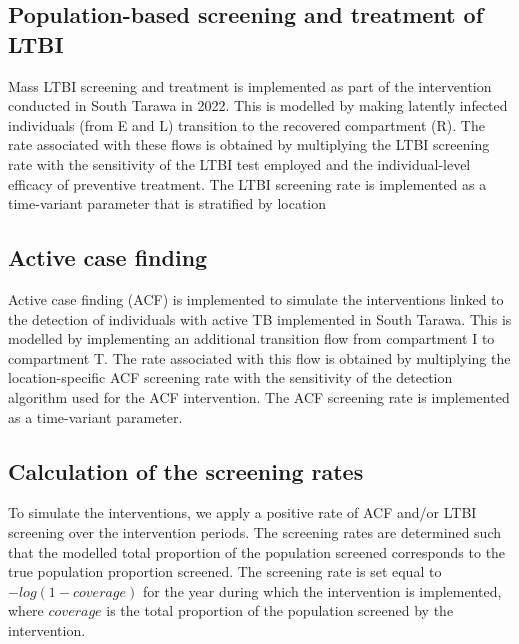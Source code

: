 \subsection{Population-based screening and treatment of LTBI}
Mass LTBI screening and treatment is implemented as part of the intervention conducted in South Tarawa in 
2022. This is modelled by making latently infected individuals (from E and L) transition to the 
recovered compartment (R). The rate associated with these flows is obtained by multiplying the LTBI 
screening rate with the sensitivity of the LTBI test employed and the individual-level efficacy of 
preventive treatment. The LTBI screening rate is implemented as a time-variant parameter that is 
stratified by location
\subsection{Active case finding}
Active case finding (ACF) is implemented to simulate the interventions linked to the detection of 
individuals with active TB implemented in South Tarawa. This is modelled by 
implementing an additional transition flow from compartment I to compartment T. The rate associated 
with this flow is obtained by multiplying the location-specific ACF screening rate with the sensitivity 
of the detection algorithm used for the ACF intervention. The ACF screening rate is implemented as a 
time-variant parameter.
\subsection{Calculation of the screening rates}
To simulate the interventions, we apply a positive rate of ACF and/or LTBI screening over the 
intervention periods. The screening rates are determined such that the modelled total proportion of the 
population screened corresponds to the true population proportion screened. The screening rate is set 
equal to \(-log(1 - coverage)\) for the year during which the intervention is implemented, where 
\(coverage\) is the total proportion of the population screened by the intervention. 